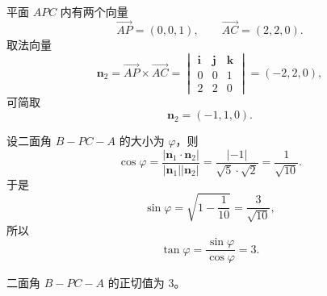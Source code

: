 \begin{answer}
平面 $APC$ 内有两个向量
\nopagebreak[4]
\[\overrightarrow{AP}=(0,0,1),\qquad \overrightarrow{AC}=(2,2,0).\]
取法向量
\nopagebreak[4]
\[\boldsymbol n_2=\overrightarrow{AP}\times\overrightarrow{AC}
=\begin{vmatrix}
\mathbf i&\mathbf j&\mathbf k\\
0&0&1\\
2&2&0
\end{vmatrix}
=(-2,2,0),\]
可简取
\nopagebreak[4]
\[\boldsymbol n_2=(-1,1,0).\]

设二面角 $B-PC-A$ 的大小为 $\varphi$，则
\nopagebreak[4]
\[\cos\varphi=\frac{|\boldsymbol n_1\cdot\boldsymbol n_2|}{|\boldsymbol n_1||\boldsymbol n_2|}
=\frac{|{-1}|}{\sqrt5\cdot\sqrt2}
=\frac1{\sqrt{10}}.\]
于是
\nopagebreak[4]
\[\sin\varphi=\sqrt{1-\frac1{10}}=\frac3{\sqrt{10}},\]
所以
\nopagebreak[4]
\[\tan\varphi=\frac{\sin\varphi}{\cos\varphi}=3.\]

二面角 $B-PC-A$ 的正切值为 $3$。



\end{answer}
